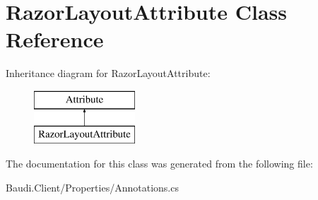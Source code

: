\hypertarget{class_razor_layout_attribute}{}\section{Razor\+Layout\+Attribute Class Reference}
\label{class_razor_layout_attribute}
Inheritance diagram for Razor\+Layout\+Attribute\+:\begin{figure}[H]
\begin{center}
\leavevmode
\includegraphics[height=2.000000cm]{class_razor_layout_attribute}
\end{center}
\end{figure}


The documentation for this class was generated from the following file\+:\begin{DoxyCompactItemize}
\item 
Baudi.\+Client/\+Properties/Annotations.\+cs\end{DoxyCompactItemize}
